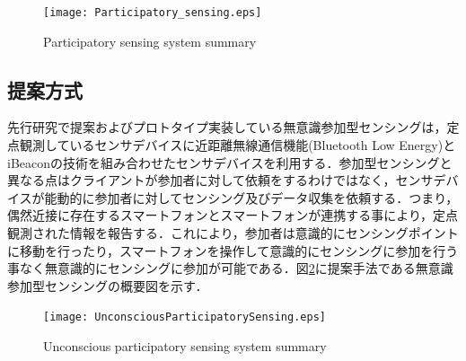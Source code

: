 \documentclass[submit,techrep]{ipsj}
\begin{document}
\begin{figure}[t]
 \begin{center}
  \texttt{[image: Participatory\_sensing.eps]}
 \end{center}
 \caption{Participatory sensing system summary}
 \label{Participatory}
\end{figure}


\subsection{提案方式}
先行研究で提案およびプロトタイプ実装している無意識参加型センシングは，定点観測しているセンサデバイスに近距離無線通信機能(Bluetooth Low Energy)とiBeacon\cite{iBeacon}の技術を組み合わせたセンサデバイスを利用する．参加型センシングと異なる点はクライアントが参加者に対して依頼をするわけではなく，センサデバイスが能動的に参加者に対してセンシング及びデータ収集を依頼する．つまり，偶然近接に存在するスマートフォンとスマートフォンが連携する事により，定点観測された情報を報告する．これにより，参加者は意識的にセンシングポイントに移動を行ったり，スマートフォンを操作して意識的にセンシングに参加を行う事なく無意識的にセンシングに参加が可能である．図\ref{UnconsciousP}に提案手法である無意識参加型センシングの概要図を示す．

\begin{figure}[t]
 \begin{center}
  \texttt{[image: UnconsciousParticipatorySensing.eps]}
 \end{center}
 \caption{Unconscious participatory sensing system summary}
 \label{UnconsciousP}
\end{figure}





\end{document}

